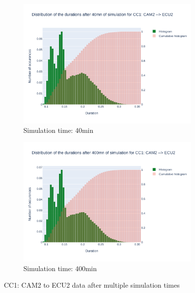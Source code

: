 \documentclass{article}
\begin{document}
\begin{figure}[H]
\begin{subfigure}{.495\textwidth}
        \centering
        \includegraphics[width=\textwidth]{../fig/data/CC1: CAM2 --> ECU2_40mn.png}
        \caption{Simulation time: 40min}
    \end{subfigure}
    \begin{subfigure}{.495\textwidth}
        \centering
        \includegraphics[width=\textwidth]{../fig/data/CC1: CAM2 --> ECU2_400mn.png}
        \caption{Simulation time: 400min}
    \end{subfigure}
    \caption{CC1: CAM2 to ECU2 data after multiple simulation times}
\end{figure}
\end{document}

